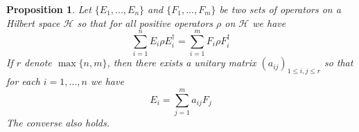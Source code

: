 \documentclass[12pt]{article}
\theoremstyle{plain}
\newtheorem{proposition}[thm]{Proposition}
\theoremstyle{definition}
\newcommand{\call}[1]{\mathcal{#1}}
\begin{document}
	\begin{proposition}\label{prop:quantum_operator_equiv}
		Let $\lbrace E_1,...,E_n\rbrace$ and $\lbrace F_1,...,F_m\rbrace$ be two sets of operators on a Hilbert space $\call{H}$ so that for all positive operators $\rho$ on $\call{H}$ we have
		\begin{equation}\label{eq:equality_qo}
			\sum_{i = 1}^n E_i \rho E_i^\dagger= \sum_{i = 1}^m F_i \rho F_i^\dagger
		\end{equation}
		If $r$ denote $\operatorname{max}\lbrace n,m \rbrace$, then there exists a unitary matrix $(a_{ij})_{1 \leq i,j \leq r}$ so that for each $i = 1,...,n$ we have
		\begin{equation}\label{eq:lin_comb_operators}
			E_i = \sum_{j = 1}^m a_{ij} F_j
		\end{equation}
		The converse also holds.
	\end{proposition}
\end{document}
